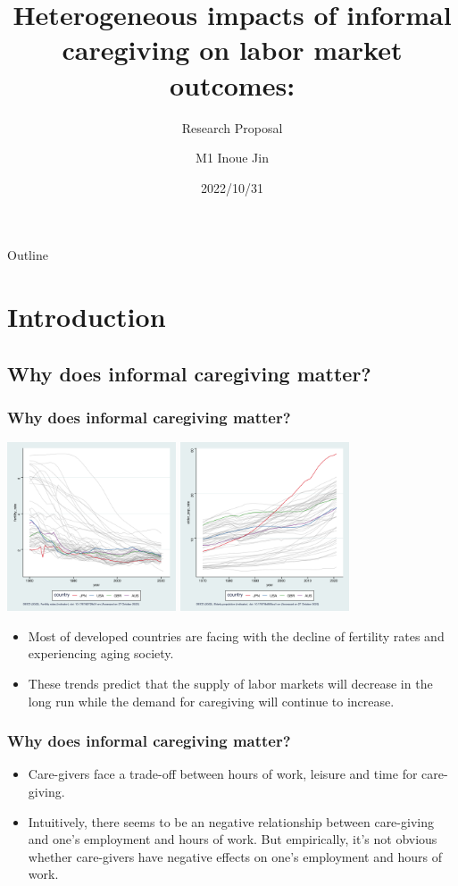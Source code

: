 \documentclass{beamer}
\title{Heterogeneous impacts of informal caregiving on labor market outcomes:}
\subtitle{Research Proposal}
\author{M1 Inoue Jin}
\institute{Hitotsubashi University}
\date{2022/10/31}
\begin{document}
\begin{frame}
    \titlepage
\end{frame}

\begin{frame}{Outline}
    \tableofcontents
\end{frame}

\section{Introduction}
    \subsection{Why does informal caregiving matter?}
        \begin{frame}\frametitle{Why does informal caregiving matter?}
            \includegraphics[height = 5cm]{OECD_fertility_rates.png}
            \includegraphics[height = 5cm]{OECD_Elderly_pop_rate.png}
            \begin{itemize}
                \item Most of developed countries are facing with the decline of fertility rates and experiencing aging society.
                \item These trends predict that the supply of labor markets will decrease in the long run while the demand for caregiving will continue to increase. 
            \end{itemize}
        \end{frame}
        \begin{frame}\frametitle{Why does informal caregiving matter?}
            \begin{itemize}
                \item Care-givers face a trade-off between hours of work, leisure and time for care-giving.
                \item Intuitively, there seems to be an negative relationship between care-giving and one's employment and hours of work. But empirically, it's not obvious whether care-givers have negative effects on  one's employment and hours of work.  
            \end{itemize}
        \end{frame}
\end{document}

